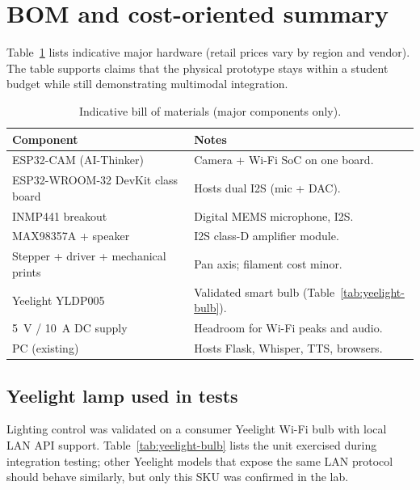 \documentclass[12pt,a4paper]{report}
\begin{document}
\section{BOM and cost-oriented summary}

Table~\ref{tab:bom} lists indicative major hardware (retail prices vary by region and vendor). The table supports claims that the physical prototype stays within a student budget while still demonstrating multimodal integration.

\begin{table}[htbp]
\centering
\caption{Indicative bill of materials (major components only).}
\label{tab:bom}
\small
\begin{tabular}{@{}p{}p{}@{}}
\toprule
\textbf{Component} & \textbf{Notes} \\
\midrule
ESP32-CAM (AI-Thinker) & Camera + Wi-Fi SoC on one board. \\
ESP32-WROOM-32 DevKit class board & Hosts dual I2S (mic + DAC). \\
INMP441 breakout & Digital MEMS microphone, I2S. \\
MAX98357A + speaker & I2S class-D amplifier module. \\
Stepper + driver + mechanical prints & Pan axis; filament cost minor. \\
Yeelight YLDP005 & Validated smart bulb (Table~\ref{tab:yeelight-bulb}). \\
5~V / 10~A DC supply & Headroom for Wi-Fi peaks and audio. \\
PC (existing) & Hosts Flask, Whisper, TTS, browsers. \\
\bottomrule
\end{tabular}
\end{table}

\subsection{Yeelight lamp used in tests}

Lighting control was validated on a consumer Yeelight Wi-Fi bulb with local LAN API support. Table~\ref{tab:yeelight-bulb} lists the unit exercised during integration testing; other Yeelight models that expose the same LAN protocol should behave similarly, but only this SKU was confirmed in the lab.
\end{document}
